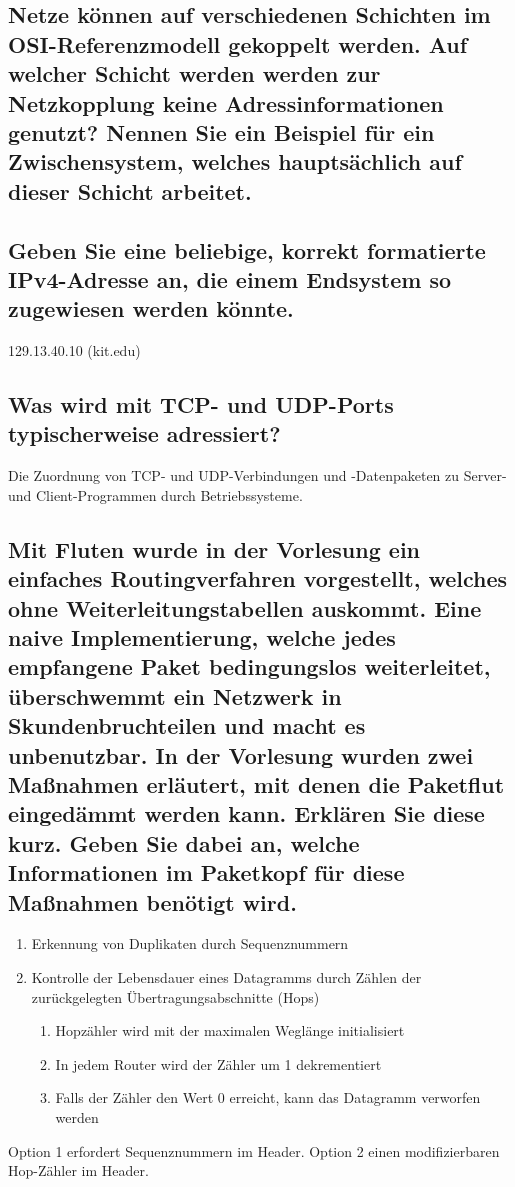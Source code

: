 \documentclass[a4paper]{article}
\begin{document}
\subsection{Netze können auf verschiedenen Schichten im OSI-Referenzmodell gekoppelt werden. Auf welcher Schicht werden werden zur Netzkopplung keine Adressinformationen genutzt? Nennen Sie ein Beispiel für ein Zwischensystem, welches hauptsächlich auf dieser Schicht arbeitet.}
\subsection{Geben Sie eine beliebige, korrekt formatierte IPv4-Adresse an, die einem Endsystem so zugewiesen werden könnte.}
129.13.40.10 (kit.edu)
\subsection{Was wird mit TCP- und UDP-Ports typischerweise adressiert?}
Die Zuordnung von TCP- und UDP-Verbindungen und -Datenpaketen zu Server- und Client-Programmen durch Betriebssysteme.
\subsection{Mit Fluten wurde in der Vorlesung ein einfaches Routingverfahren vorgestellt, welches ohne Weiterleitungstabellen auskommt. Eine naive Implementierung, welche jedes empfangene Paket bedingungslos weiterleitet, überschwemmt ein Netzwerk in Skundenbruchteilen und macht es unbenutzbar. In der Vorlesung wurden zwei Maßnahmen erläutert, mit denen die Paketflut eingedämmt werden kann. Erklären Sie diese kurz. Geben Sie dabei an, welche Informationen im Paketkopf für diese Maßnahmen benötigt wird.}
\begin{enumerate}
\item Erkennung von Duplikaten durch Sequenznummern
\item Kontrolle der Lebensdauer eines Datagramms durch Zählen der zurückgelegten Übertragungsabschnitte (Hops)
\begin{enumerate}
\item Hopzähler wird mit der maximalen Weglänge initialisiert
\item In jedem Router wird der Zähler um 1 dekrementiert
\item Falls der Zähler den Wert 0 erreicht, kann das Datagramm verworfen werden
\end{enumerate}
\end{enumerate}
Option 1 erfordert Sequenznummern im Header.
Option 2 einen modifizierbaren Hop-Zähler im Header.
\end{document}
